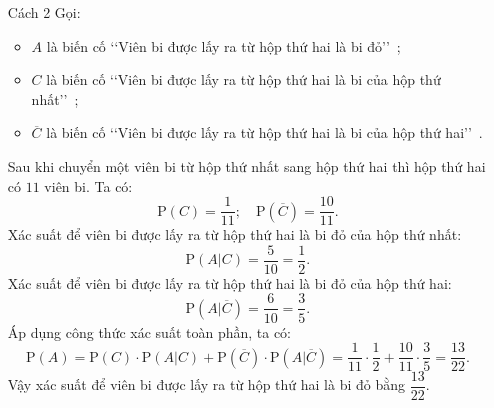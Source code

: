 \begin{ex}
{\begin{itemize}
\begin{itemchoice}
		Vậy xác suất để viên bi được lấy ra từ hộp thứ hai là bi đỏ bằng $\dfrac{13}{22}$.
		\end{itemchoice}
						\item[Cách 2] Gọi:
			\begin{itemize}
				\item $A$ là biến cố \lq \lq Viên bi được lấy ra từ hộp thứ hai là bi đỏ\rq \rq~;
				\item $C$ là biến cố \lq \lq Viên bi được lấy ra từ hộp thứ hai là bi của hộp thứ nhất\rq \rq~;
				\item $\overline{C}$ là biến cố \lq \lq Viên bi được lấy ra từ hộp thứ hai là bi của hộp thứ hai\rq \rq~.
			\end{itemize}
			Sau khi chuyển một viên bi từ hộp thứ nhất sang hộp thứ hai thì hộp thứ hai có $11$ viên bi. Ta có: 
			$$\mathrm{P}(C)=\dfrac{1}{11};\quad \mathrm{P}(\overline{C})=\dfrac{10}{11}.$$
			Xác suất để viên bi được lấy ra từ hộp thứ hai là bi đỏ của hộp thứ nhất: 
			$$\mathrm{P}(A|C)=\dfrac{5}{10}=\dfrac{1}{2}.$$
			Xác suất để viên bi được lấy ra từ hộp thứ hai là bi đỏ của hộp thứ hai: 
			$$\mathrm{P}(A|\overline{C})=\dfrac{6}{10}=\dfrac{3}{5}.$$
			Áp dụng công thức xác suất toàn phần, ta có:
			$$\mathrm{P}(A) = \mathrm{P}(C)\cdot \mathrm{P}(A|C) + \mathrm{P}(\overline{C})\cdot \mathrm{P}(A|\overline{C}) =\dfrac{1}{11}\cdot \dfrac{1}{2}+\dfrac{10}{11}\cdot \dfrac{3}{5}=\dfrac{13}{22}.$$
			Vậy xác suất để viên bi được lấy ra từ hộp thứ hai là bi đỏ bằng $\dfrac{13}{22}$.
		\end{itemize}
	}
\end{ex}

